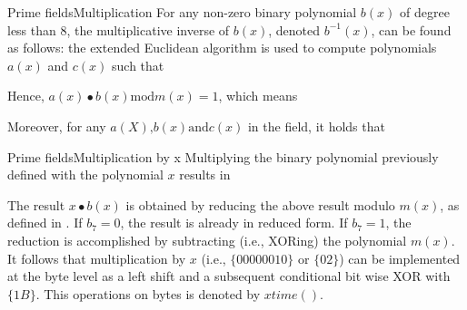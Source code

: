 \begin{frame}[t]{Prime fields}{Multiplication}
	For any non-zero binary polynomial $b(x)$ of degree less than 8, the multiplicative inverse of $b(x)$, denoted $b^{-1}(x)$, can be found as follows: the extended Euclidean algorithm is used to compute polynomials $a(x)$ and $c(x)$ such that \\
	\medskip
	
	
	\medskip
	
	\begin{flushleft}
		Hence, $a(x) \bullet b(x) \text{mod} m(x) = 1$, which means
	\end{flushleft}

	
	
	\medskip
	\begin{flushleft}
		Moreover, for any $a(X) \text{,} b(x) \text{and} c(x)$ in the field, it holds that
	\end{flushleft}
	
	
\end{frame}

\begin{frame}[t]{Prime fields}{Multiplication by x}
	Multiplying the binary polynomial previously defined with the polynomial $x$ results in \\
	\medskip
	
	
	\medskip
	
	\begin{flushleft}
		The result $x \bullet b(x)$ is obtained by reducing the above result modulo $m(x)$, as defined in \cite{Rijndael2020design}. If $b_7 = 0$, the result is already in reduced form. If $b_7=1$, the reduction is accomplished by subtracting (i.e., XORing) the polynomial $m(x)$. It follows  that multiplication by $x$ (i.e., $\{00000010\}$ or $\{02\}$) can be implemented at the byte level as a left shift and a subsequent conditional bit wise XOR with $\{1B\}$. This operations on bytes is denoted by $xtime()$.
	\end{flushleft}

\end{frame}



